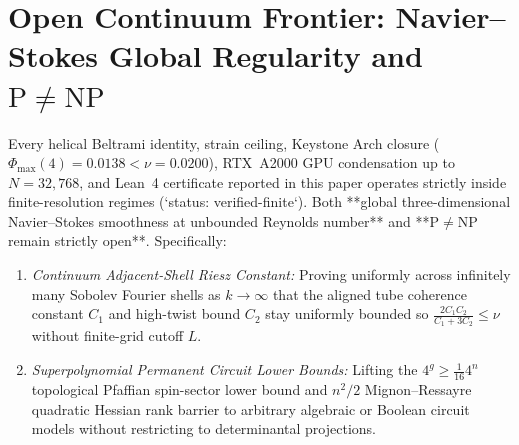 \documentclass[10pt]{article}
\renewcommand{\_}{\OrigUnderscore\hspace{0pt}}
\numberwithin{equation}{section}
\begin{document}
\section{Open Continuum Frontier: Navier--Stokes Global Regularity and \texorpdfstring{$\mathrm{P} \neq \mathrm{NP}$}{P != NP}}\label{app:ns-open-frontier}

Every helical Beltrami identity, strain ceiling, Keystone Arch closure ($\Phi_{\max}(4) = 0.0138 < \nu = 0.0200$), RTX~A2000 GPU condensation up to $N = 32{,}768$, and Lean~4 certificate reported in this paper operates strictly inside finite-resolution regimes (`status: verified-finite`). Both **global three-dimensional Navier--Stokes smoothness at unbounded Reynolds number** and **$\mathrm{P} \neq \mathrm{NP}$ remain strictly open**. Specifically:
\begin{enumerate}
\item \emph{Continuum Adjacent-Shell Riesz Constant:} Proving uniformly across infinitely many Sobolev Fourier shells as $k \to \infty$ that the aligned tube coherence constant $C_1$ and high-twist bound $C_2$ stay uniformly bounded so $\frac{2C_1 C_2}{C_1 + 3C_2} \le \nu$ without finite-grid cutoff $L$.
\item \emph{Superpolynomial Permanent Circuit Lower Bounds:} Lifting the $4^g \ge \frac{1}{16}4^n$ topological Pfaffian spin-sector lower bound and $n^2/2$ Mignon--Ressayre quadratic Hessian rank barrier to arbitrary algebraic or Boolean circuit models without restricting to determinantal projections.
\end{enumerate}
\end{document}
